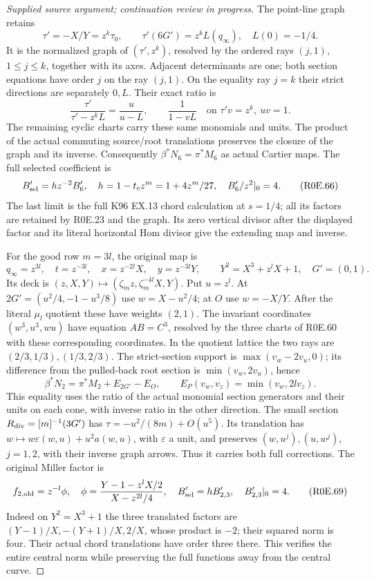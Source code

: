 \begin{proof}[Supplied source argument; continuation review in progress]
The point-line graph retains
\[
 \tau'=-X/Y=z^k\tau_0,\qquad
 \tau'(6G')=z^kL(q_\infty),\quad L(0)=-1/4.
 \tag{R0E.64}
\]
It is the normalized graph of \((\tau',z^k)\), resolved by the
ordered rays \((j,1)\), \(1\le j\le k\), together with its axes.
Adjacent determinants are one; both section equations have order
\(j\) on the ray \((j,1)\). On the equality ray \(j=k\) their
strict directions are separately \(0,L\). Their exact ratio is
\[
 \frac{\tau'}{\tau'-z^kL}=\frac u{u-L},\qquad
 \frac1{1-vL}\quad\text{on }\tau'v=z^k,\ uv=1.
 \tag{R0E.65}
\]
The remaining cyclic charts carry these same monomials and units.
The product of the actual commuting source/root translations
preserves the closure of the graph and its inverse. Consequently
\(\beta^*N_6=\pi^*M_6\) as actual Cartier maps. The full selected
coefficient is
\[
 B'_{\rm sel}=h z^{-2}B'_6,\quad
 h=1-t_cz^m=1+4z^m/27,\quad B'_6/z^2|_0=4.
 \tag{R0E.66}
\]
The last limit is the full K96 EX.13 chord calculation at
\(s=1/4\); all its factors are retained by R0E.23 and the graph.
Its zero vertical divisor after the displayed factor and its
literal horizontal Hom divisor give the extending map and inverse.

For the good row \(m=3l\), the original map is
\[
 q_\infty=z^{3l},\quad t=z^{-3l},\quad
 x=z^{-2l}X,\quad y=z^{-3l}Y,\qquad
 Y^2=X^3+z^lX+1,\quad G'=(0,1).
 \tag{R0E.67}
\]
Its deck is \((z,X,Y)\mapsto(\zeta_mz,\zeta_m^{-4l}X,Y)\).
Put \(u=z^l\). At \(2G'=(u^2/4,-1-u^3/8)\) use
\(w=X-u^2/4\); at \(O\) use \(w=-X/Y\). After the literal
\(\mu_l\) quotient these have weights \((2,1)\). The invariant
coordinates \((w^3,u^3,wu)\) have equation \(AB=C^3\), resolved
by the three charts of R0E.60 with these corresponding coordinates.
In the quotient lattice the two rays are
\((2/3,1/3),(1/3,2/3)\). The strict-section support is
\(\max(v_w-2v_u,0)\); its difference from the pulled-back root
section is \(\min(v_w,2v_u)\), hence
\[
 \beta^*N_2=\pi^*M_2+E_{2G'}-E_O,\qquad
 E_P(v_w,v_z)=\min(v_w,2l v_z).
 \tag{R0E.68}
\]
This equality uses the ratio of the actual monomial section
generators and their units on each cone, with inverse ratio in the
other direction. The small section
\(R_{\rm div}=[m]^{-1}(3G')\) has
\(\tau=-u^2/(8m)+O(u^5)\). Its translation has
\(w\mapsto w\varepsilon(w,u)+u^2a(w,u)\), with \(\varepsilon\)
a unit, and preserves \((w,u^j),(u,w^j)\), \(j=1,2\), with their
inverse graph arrows. Thus it carries both full corrections.
The original Miller factor is
\[
 f_{2,\rm old}=z^{-l}\phi,\quad
 \phi=\frac{Y-1-z^lX/2}{X-z^{2l}/4},\quad
 B'_{\rm sel}=hB'_{2,3},\quad B'_{2,3}|_0=4.
 \tag{R0E.69}
\]
Indeed on \(Y^2=X^3+1\) the three translated factors are
\((Y-1)/X,-(Y+1)/X,2/X\), whose product is \(-2\); their squared
norm is four. Their actual chord translations have order three
there. This verifies the entire central norm while preserving the
full functions away from the central curve.


\end{proof}
